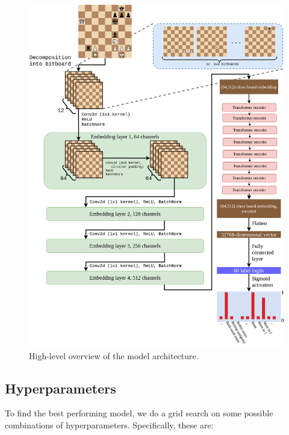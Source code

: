 \begin{figure}[H]
  \centering
  \includegraphics[width=\textwidth]{project/img/ml_diagram.png}
  \caption{High-level overview of the model architecture.}
  \label{MLDiagram}
\end{figure}

\subsection{Hyperparameters}\label{mlS22}

To find the best performing model, we do a grid search on some possible
combinations of hyperparameters. Specifically, these are:

